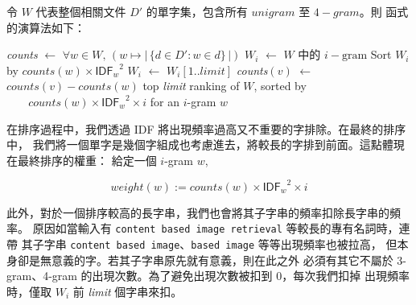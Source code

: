令 $W$ 代表整個相關文件 $D'$ 的單字集，包含所有 $unigram$ 至 $4-gram$。則
 函式的演算法如下：

\begin{algorithmic}
    \State \textit{counts} $\gets$ $\forall w\in W,\,\left(w\mapsto|\,\{d\in D':w\in d\}\,|\right)$
      \State $W_i$ $\gets$ $W$ 中的 $i-\text{gram}$
      \State Sort $W_i$ by $\mathit{counts}(w)\times {\mathsf{IDF}_w}^2$
      \State $W_i$ $\gets$ $W_i[1..\mathit{limit}]$
          \State \textit{counts}$(v)$ $\gets$ $\mathit{counts}(v)-\mathit{counts}(w)$
        \EndFor
      \EndFor
    \EndFor
    \State\Return top \textit{limit} ranking of $W$, sorted by
    \State   $\;\;\;\;\;\;\;\mathit{counts}(w)\times{\mathsf{IDF}_w}^2\times i$ for an $i$-gram $w$
  \EndFunction

  在排序過程中，我們透過 \textsf{IDF} 將出現頻率過高又不重要的字排除。在最終的排序中，
  我們將一個單字是幾個字組成也考慮進去，將較長的字排到前面。這點體現在最終排序的權重：
  給定一個 $i$-gram $w$,

  \[ \mathit{weight}(w) := \mathit{counts}(w)\times{\mathsf{IDF}_w}^2\times i \]

  此外，對於一個排序較高的長字串，我們也會將其子字串的頻率扣除長字串的頻率。
  原因如當輸入有 \texttt{content based image retrieval} 等較長的專有名詞時，連帶
  其子字串 \texttt{content based image}、\texttt{based image} 等等出現頻率也被拉高，
  但本身卻是無意義的字。若其子字串原先就有意義，則在此之外
  必須有其它不屬於 3-gram、4-gram 的出現次數。為了避免出現次數被扣到 0，每次我們扣掉
  出現頻率時，僅取 $W_i$ 前 \textit{limit} 個字串來扣。
\end{algorithmic}
